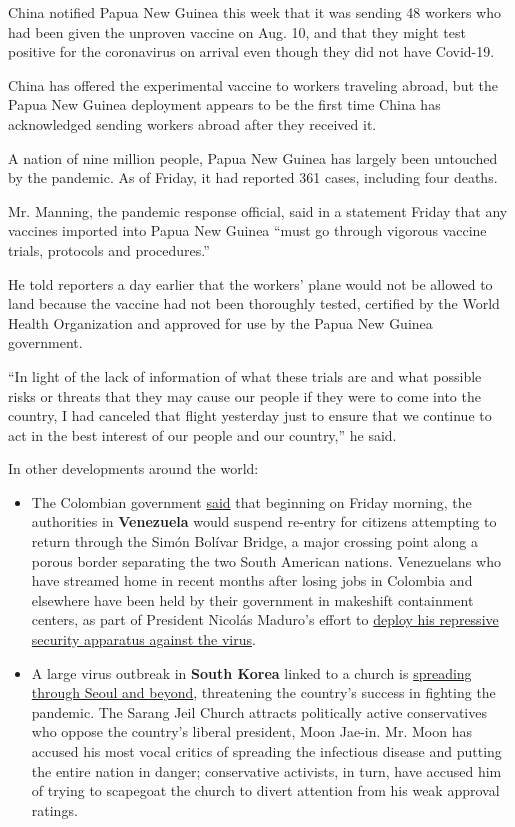 China notified Papua New Guinea this week that it was sending 48 workers
who had been given the unproven vaccine on Aug. 10, and that they might
test positive for the coronavirus on arrival even though they did not
have Covid-19.

China has offered the experimental vaccine to workers traveling abroad,
but the Papua New Guinea deployment appears to be the first time China
has acknowledged sending workers abroad after they received it.

A nation of nine million people, Papua New Guinea has largely been
untouched by the pandemic. As of Friday, it had reported 361 cases,
including four deaths.

Mr. Manning, the pandemic response official, said in a statement Friday
that any vaccines imported into Papua New Guinea ``must go through
vigorous vaccine trials, protocols and procedures.''

He told reporters a day earlier that the workers' plane would not be
allowed to land because the vaccine had not been thoroughly tested,
certified by the World Health Organization and approved for use by the
Papua New Guinea government.

``In light of the lack of information of what these trials are and what
possible risks or threats that they may cause our people if they were to
come into the country, I had canceled that flight yesterday just to
ensure that we continue to act in the best interest of our people and
our country,'' he said.

In other developments around the world:

\begin{itemize}
\item
  The Colombian government
  \href{https://www.migracioncolombia.gov.co/noticias}{said} that
  beginning on Friday morning, the authorities in \textbf{Venezuela}
  would suspend re-entry for citizens attempting to return through the
  Simón Bolívar Bridge, a major crossing point along a porous border
  separating the two South American nations. Venezuelans who have
  streamed home in recent months after losing jobs in Colombia and
  elsewhere have been held by their government in makeshift containment
  centers, as part of President Nicolás Maduro's effort to
  \href{https://www.nytimes3xbfgragh.onion/2020/08/19/world/americas/coronavirus-venezuela.html}{deploy
  his repressive security apparatus against the virus}.
\item
  A large virus outbreak in \textbf{South Korea} linked to a church is
  \href{https://www.nytimes3xbfgragh.onion/2020/08/20/world/asia/coronavirus-south-korea-church-sarang-jeil.html}{spreading
  through Seoul and beyond}, threatening the country's success in
  fighting the pandemic. The Sarang Jeil Church attracts politically
  active conservatives who oppose the country's liberal president, Moon
  Jae-in. Mr. Moon has accused his most vocal critics of spreading the
  infectious disease and putting the entire nation in danger;
  conservative activists, in turn, have accused him of trying to
  scapegoat the church to divert attention from his weak approval
  ratings.
\end{itemize}

